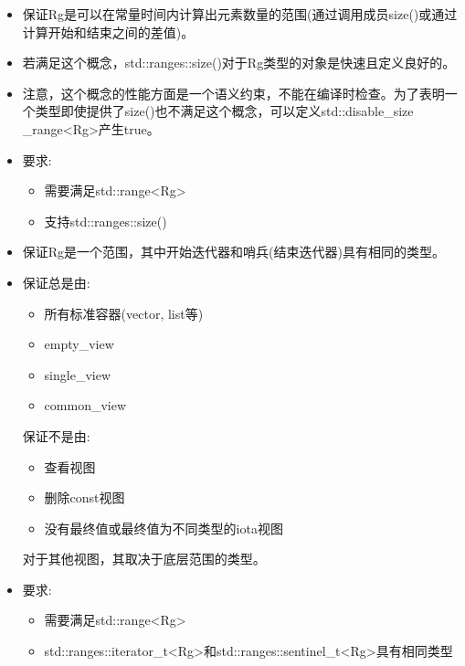 \begin{itemize}
\item
保证Rg是可以在常量时间内计算出元素数量的范围(通过调用成员size()或通过计算开始和结束之间的差值)。

\item
若满足这个概念，std::ranges::size()对于Rg类型的对象是快速且定义良好的。

\item
注意，这个概念的性能方面是一个语义约束，不能在编译时检查。为了表明一个类型即使提供了size()也不满足这个概念，可以定义std::disable\_size \_range<Rg>产生true。

\item
要求:

\begin{itemize}
\item
需要满足std::range<Rg>

\item
支持std::ranges::size()
\end{itemize}
\end{itemize}


\begin{itemize}
\item
保证Rg是一个范围，其中开始迭代器和哨兵(结束迭代器)具有相同的类型。

\item
保证总是由:

\begin{itemize}
\item
所有标准容器(vector, list等)

\item
empty\_view

\item
single\_view

\item
common\_view
\end{itemize}

保证不是由:

\begin{itemize}
\item
查看视图

\item
删除const视图

\item
没有最终值或最终值为不同类型的iota视图
\end{itemize}

对于其他视图，其取决于底层范围的类型。

\item
要求:

\begin{itemize}
\item
需要满足std::range<Rg>

\item
std::ranges::iterator\_t<Rg>和std::ranges::sentinel\_t<Rg>具有相同类型
\end{itemize}
\end{itemize}

